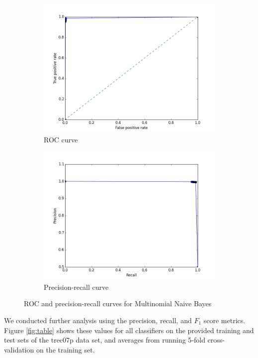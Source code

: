 \documentclass{article} %
\begin{document}
\begin{figure}[h]
  \centering
  \begin{subfigure}{0.35\textwidth}
    \includegraphics[width=\textwidth]{images/naive_bayes_roc_curve.png}
    \caption{ROC curve}
  \end{subfigure}
  \begin{subfigure}{0.35\textwidth}
    \includegraphics[width=\textwidth]{images/naive_bayes_pr_curve.png}
    \caption{Precision-recall curve}
  \end{subfigure}
  \caption{ROC and precision-recall curves for Multinomial Naive Bayes}
  \label{fig:nb}
\end{figure}

We conducted further analysis using the precision, recall, and $F_1$ score metrics. Figure \ref{fig:table} shows these values for all classifiers on the provided training and test sets of the trec07p data set, and averages from running 5-fold cross-validation on the training set. 
\end{document}
